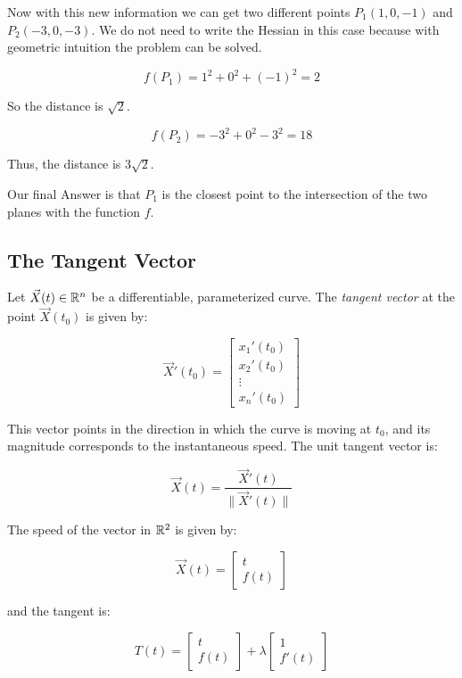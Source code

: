 Now with this new information we can get two different points \(P_1(1, 0, -1)\) and \(P_2(-3, 0, -3)\).
We do not need to write the Hessian in this case because with geometric intuition the problem can be 
solved.

\[
    f(P_1) = 1^2 + 0^2 + (-1)^2 = 2 
\]

So the distance is \(\sqrt{2}\).

\[
    f(P_2) = -3^2 + 0^2 -3^2 = 18
\]

Thus, the distance is \(3\sqrt{2}\).

Our final Answer is that \(P_1\) is the closest point to the intersection of the two planes with the 
function \(f\).

\subsection{The Tangent Vector}

Let \( \vec{X}(t) \in \mathbb{R}^n \) be a differentiable, parameterized curve. The \emph{tangent vector} 
at the point \( \vec{X}(t_0) \) is given by:

\[
    \vec{X}'(t_0) = \begin{bmatrix}
        x_1 ' (t_0) \\ x_2 ' (t_0) \\ \vdots \\ x_n ' (t_0)
    \end{bmatrix}
\]

This vector points in the direction in which the curve is moving at \( t_0 \), and its magnitude 
corresponds to the instantaneous speed. The unit tangent vector is:

\[
    \vec{X}(t) = \frac{\vec{X}'(t)}{\|\vec{X}'(t)\|}
\]

The speed of the vector in \(\mathbb{R}^2\) is given by:

\[
    \vec{X}(t) = \begin{bmatrix}
        t \\ f(t)
    \end{bmatrix}
\]

and the tangent is:

\[
    T(t) = \begin{bmatrix}
        t \\ f(t)
    \end{bmatrix} + \lambda \begin{bmatrix}
        1 \\ f'(t)
    \end{bmatrix}
\]

